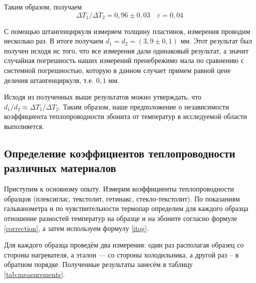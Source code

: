 \documentclass[a4paper,12pt]{article} %
\begin{document}
Таким образом, получаем \[ \Delta T_1 / \Delta T_2 = 0,96\pm0,03 \quad \varepsilon = 0,04 \]
 

С помощью штангенциркуля измеряем толщину пластинок, измерения проводим несколько раз. В итоге получаем $ d_1 = d_2 = (3,9\pm0,1) $ мм. Этот результат был получен исходя ис того, что все измерения дали одинаковый результат, а значит случайная погрешность наших измерений пренебрежимо мала по сравнению с системной погрешностью, которую в данном случает примем равной цене деления штангенциркуля, т.е. $ 0,1 $ мм.

Исходя из полученных выше результатов можно утверждать, что $ d_1/d_2\approx\Delta T_1 / \Delta T_2 $. Таким образом, наше предположение о независимости коэффициента теплопроводности эбонита от температур в исследуемой области выполняется.

\subsection{Определение коэффициентов теплопроводности различных материалов}

Приступим к основному опыту. Измерим коэффициенты теплопроводности образцов (плексиглас, текстолит, гетинакс, стекло-текстолит). По показаниям гальванометра и по чувствительности термопар определим для каждого образца отношение разностей температур на образце и на эбоните согласно формуле \eqref{correction}, а затем используем формулу \eqref{itog}.

Для каждого образца проведём два измерения: один раз располагая образец со стороны нагревателя, а эталон — со стороны холодильника, а другой раз -- в обратном порядке. Полученные результаты занесём в таблицу \ref{tab:measurements}.
\end{document}
